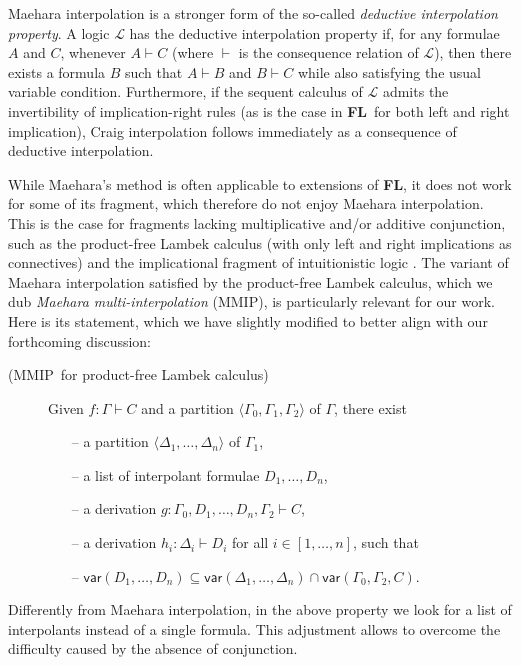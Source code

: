 \documentclass[sn-mathphys-num]{sn-jnl}%
\newcommand{\GG}{\Gamma}
\newcommand{\GD}{\Delta}
\newcommand{\vd}{\vdash}
\newcommand{\mc}[1]{\mathcal{#1}}
\newcommand{\mf}[1]{\mathsf{#1}}
\newcommand{\gs}[1]{\sigma_{X} (#1)}
\newcommand{\vars}[1]{\mf{var} (#1)}
\newcommand{\FL}{\textbf{FL}}
\newcommand{\MMIP}{\textsf{MMIP}}
\newcommand{\niccolo}[1]{\textcolor{red}{NV: #1}}
\theoremstyle{thmstyleone}%
\theoremstyle{thmstyletwo}%
\theoremstyle{thmstylethree}%
\begin{document}
Maehara interpolation is a stronger form of the so-called \emph{deductive interpolation property}. A logic $\mc{L}$ has the deductive interpolation property if, for any formulae $A$ and $C$, whenever $A \vd C$ (where $\vd$ is the consequence relation of $\mc{L}$), then there exists a formula $B$ such that $A \vd B$ and $B \vd C$ while also satisfying the usual variable condition. Furthermore, if the sequent calculus of $\mc{L}$ admits the invertibility of implication-right rules (as is the case in \FL\ for both left  and right implication), Craig interpolation follows immediately as a consequence of deductive interpolation.

While Maehara's method is often applicable to extensions of \FL, it does not work for some of its fragment, which therefore do not enjoy Maehara interpolation. This is the case for fragments lacking multiplicative and/or additive conjunction, such as the product-free Lambek calculus \cite{Pentus1997} (with only left  and right implications as connectives) and the implicational fragment of intuitionistic logic \cite{Kanazawa2006}. 
The variant of Maehara interpolation satisfied by the product-free Lambek calculus, which we dub \emph{Maehara multi-interpolation} (\MMIP), is particularly relevant for our work. Here is its statement, which we have slightly modified to better align with our forthcoming discussion:
\begin{description}
  \item[(\MMIP~for product-free Lambek calculus)]  Given $f: \GG \vd C$ and a partition $\langle \GG_0,\GG_1, \GG_2 \rangle$ of $\GG$, there exist 
  \begin{itemize}
    \item[--] a partition $\langle \GD_1, \dots, \GD_n \rangle$ of $\GG_1$,
    \item[--] a list of interpolant formulae $D_1, \dots, D_n$,
    \item[--] a derivation $g: \GG_0, D_1, \dots, D_n, \GG_2 \vd C$,
    \item[--] a derivation $h_i : \GD_i \vd D_i$ for all $i \in [1, \dots, n]$, such that
    \item[--] $\vars{D_1, \dots, D_n} \subseteq \vars{\GD_1 , \dots , \GD_n} \cap \vars{\GG_0, \GG_2, C}$.
  \end{itemize}
\end{description}
Differently from Maehara interpolation, in the above property we look for a  list of interpolants instead of a single formula.
This adjustment allows to overcome the difficulty caused by the absence of conjunction.
\end{document}

